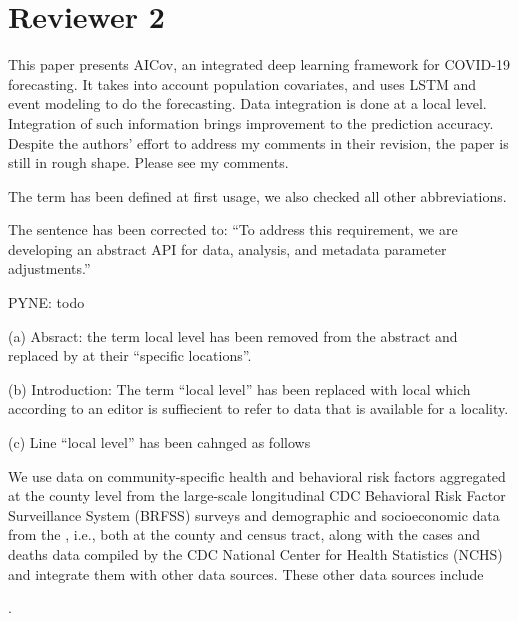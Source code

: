 \section*{Reviewer 2}

This paper presents AICov, an integrated deep learning framework for
COVID-19 forecasting. It takes into account population covariates, and
uses LSTM and event modeling to do the forecasting. Data integration
is done at a local level. Integration of such information brings
improvement to the prediction accuracy. Despite the authors’ effort to
address my comments in their revision, the paper is still in rough
shape. Please see my comments.

\bigskip

  { The term has been defined at first usage, we also checked all
    other abbreviations. }



  {The sentence has been corrected to: ``To address this requirement, we are developing an
  abstract API for data, analysis, and metadata parameter
  adjustments.''}


  {PYNE: todo

  (a) Absract: the term local level has been removed from the abstract and
  replaced by at their ``specific locations''.

  (b) Introduction: The term ``local level'' has been replaced with local which
  according to an editor is suffiecient to refer to data that is
  available for a locality.

  (c) Line   ``local level'' has been cahnged as follows
  
We use data on community-specific health and behavioral risk factors
aggregated at the county level from the large-scale longitudinal CDC
Behavioral Risk Factor Surveillance System (BRFSS) surveys
\citep{www-cdc-brfss} and demographic and socioeconomic data from the
\citet{www-sensus}, i.e., both at the county and
census tract, along with the cases and deaths data compiled by
the CDC National Center for Health Statistics (NCHS)
\citep{www-cdc-nchs} and integrate them with other data sources. These
other data sources include

.

}

